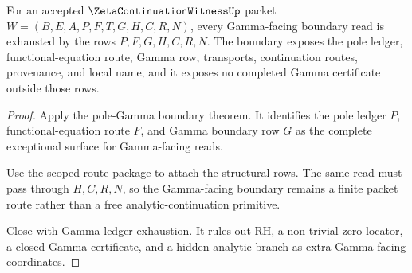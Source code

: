 \begin{theorem}
\label{thm:zeta-continuation-witness-gamma-boundary-scope}
For an accepted $\ZetaContinuationWitnessUp$ packet $W=(B,E,A,P,F,T,G,H,C,R,N)$, every Gamma-facing boundary read is exhausted by the rows $P,F,G,H,C,R,N$. The boundary exposes the pole ledger, functional-equation route, Gamma row, transports, continuation routes, provenance, and local name, and it exposes no completed Gamma certificate outside those rows.
\end{theorem}
\begin{proof}
Apply the pole-Gamma boundary theorem. It identifies the pole ledger $P$, functional-equation route $F$, and Gamma boundary row $G$ as the complete exceptional surface for Gamma-facing reads.

Use the scoped route package to attach the structural rows. The same read must pass through $H,C,R,N$, so the Gamma-facing boundary remains a finite packet route rather than a free analytic-continuation primitive.

Close with Gamma ledger exhaustion. It rules out RH, a non-trivial-zero locator, a closed Gamma certificate, and a hidden analytic branch as extra Gamma-facing coordinates.
\end{proof}








